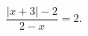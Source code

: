 \begin{ex}[type=equation]
	\begin{condition}
		$\dfrac{\big|x + 3\big| - 2}{2 - x}= 2.$
	\end{condition}
\end{ex}